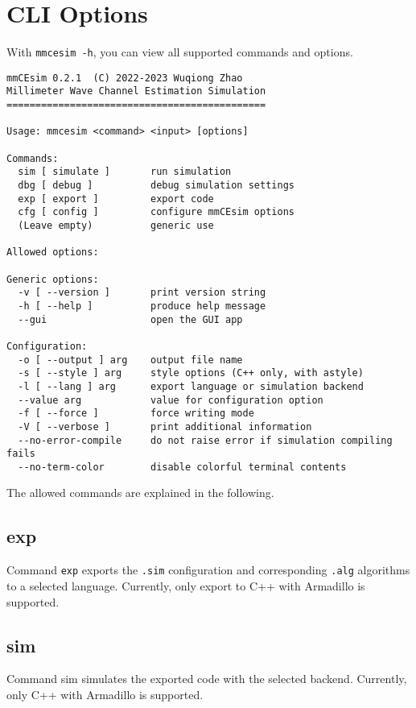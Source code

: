 \section{CLI Options}
With \texttt{mmcesim -h}, you can view all supported commands and options.
\begin{lstlisting}
mmCEsim 0.2.1  (C) 2022-2023 Wuqiong Zhao
Millimeter Wave Channel Estimation Simulation
=============================================

Usage: mmcesim <command> <input> [options]

Commands:
  sim [ simulate ]       run simulation
  dbg [ debug ]          debug simulation settings
  exp [ export ]         export code
  cfg [ config ]         configure mmCEsim options
  (Leave empty)          generic use

Allowed options:

Generic options:
  -v [ --version ]       print version string
  -h [ --help ]          produce help message
  --gui                  open the GUI app

Configuration:
  -o [ --output ] arg    output file name
  -s [ --style ] arg     style options (C++ only, with astyle)
  -l [ --lang ] arg      export language or simulation backend
  --value arg            value for configuration option
  -f [ --force ]         force writing mode
  -V [ --verbose ]       print additional information
  --no-error-compile     do not raise error if simulation compiling fails
  --no-term-color        disable colorful terminal contents
\end{lstlisting}

The allowed commands are explained in the following.

\subsection{exp}
Command \texttt{exp} exports the \texttt{.sim} configuration and corresponding \texttt{.alg} algorithms
to a selected language.
Currently, only export to C++ with Armadillo is supported.

\subsection{sim}\label{d:subsec:sim}
Command sim simulates the exported code with the selected backend. Currently, only C++ with Armadillo is supported.

